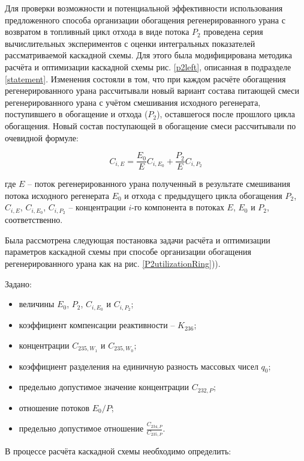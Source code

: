 Для проверки возможности и потенциальной эффективности использования предложенного способа организации обогащения регенерированного урана с возвратом в топливный цикл отхода в виде потока $P_2$ проведена серия вычислительных экспериментов с оценки интегральных показателей рассматриваемой каскадной схемы. Для этого была модифицирована методика расчёта и оптимизации каскадной схемы рис. \ref{p2left}, описанная в подразделе \ref{statement}. Изменения состояли в том, что при каждом расчёте обогащения регенерированного урана рассчитывали новый вариант состава питающей смеси регенерированного урана с учётом смешивания исходного регенерата, поступившего в обогащение и отхода ($P_2$), оставшегося после прошлого цикла обогащения. Новый состав поступающей в обогащение смеси рассчитывали по очевидной формуле:

\begin{equation} \label{Cie} 
    C_{i,E}=\frac{E_0}{E}{C_{i,{E_0}}} + \frac{P_2}{E}{C_{i,{P_2}}}
\end{equation}

где $E$ -- поток регенерированного урана полученный в результате смешивания потока исходного регенерата $E_0$ и отхода с предыдущего цикла обогащения $P_2$, $C_{i,E}$, $C_{i,{E_0}}$, $C_{i,{P_2}}$ -- концентрации $i$-го компонента в потоках $E$, $E_0$ и $P_2$, соответственно.     

Была рассмотрена следующая постановка задачи расчёта и оптимизации параметров каскадной схемы при способе организации обогащения регенерированного урана как на рис. \ref{P2utilizationRing})).

Задано:

\begin{itemize}
    \item величины $E_0$, $P_2$, $C_{i,{E_0}}$ и $C_{i,{P_2}}$; 
    \item коэффициент компенсации реактивности -- $K_{236}$;
    \item концентрации $C_{235,{W_1}}$ и $C_{235,{W_0}}$;
    \item коэффициент разделения на единичную разность массовых чисел $q_{0}$;
    \item предельно допустимое значение концентрации $C_{232,{P}}$;
    \item отношение потоков ${E_0}/P$;
    \item предельно допустимое отношение $\frac{C_{234,{P}}}{C_{235,{P}}}$. 
\end{itemize}

В процессе расчёта каскадной схемы необходимо определить:


